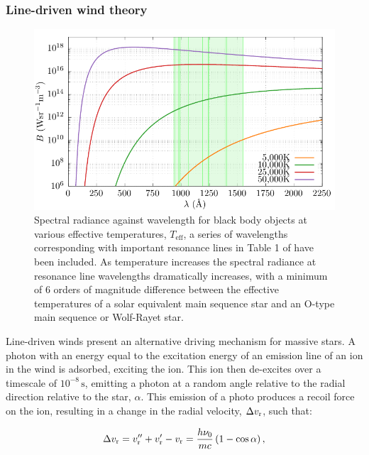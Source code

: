 \subsubsection{Line-driven wind theory}
\label{sec:cak}

\begin{figure}[h]
  \centering
  \includegraphics{assets/plancks-law/plancks-law.pdf}
  \caption[Planck's law radiance comparison with resonance lines]{Spectral radiance against wavelength for black body objects at various effective temperatures, $T_{\text{eff}}$, a series of wavelengths corresponding with important resonance lines in Table 1 of \textcite{lucy_mass_1970} have been included. As temperature increases the spectral radiance at resonance line wavelengths dramatically increases, with a minimum of 6 orders of magnitude difference between the effective temperatures of a solar equivalent main sequence star and an O-type main sequence or Wolf-Rayet star.}
  \label{fig:planck-comp}
\end{figure}

Line-driven winds present an alternative driving mechanism for massive stars.
A photon with an energy equal to the excitation energy of an emission line of an ion in the wind is adsorbed, exciting the ion.
This ion then de-excites over a timescale of $10^{-8} \, \si{\second}$, emitting a photon at a random angle relative to the radial direction relative to the star, $\alpha$.
This emission of a photo produces a recoil force on the ion, resulting in a change in the radial velocity, $\Delta v_\text{r}$, such that:

\begin{equation}
  \Delta v_\text{r} = v_\text{r}'' + v_\text{r}' - v_\text{r} = \frac{h\nu_0}{mc} \left(1-\cos \alpha \right),
\end{equation}

